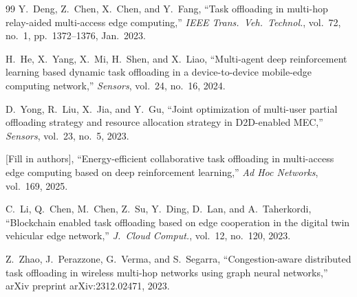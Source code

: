 \begin{thebibliography}{99}
Y.~Deng, Z.~Chen, X.~Chen, and Y.~Fang,
``Task offloading in multi-hop relay-aided multi-access edge computing,''
\textit{IEEE Trans.\ Veh.\ Technol.}, vol.~72, no.~1, pp.~1372--1376, Jan.\ 2023.

H.~He, X.~Yang, X.~Mi, H.~Shen, and X.~Liao,
``Multi-agent deep reinforcement learning based dynamic task offloading in a
device-to-device mobile-edge computing network,''
\textit{Sensors}, vol.~24, no.~16, 2024.

D.~Yong, R.~Liu, X.~Jia, and Y.~Gu,
``Joint optimization of multi-user partial offloading strategy and resource
allocation strategy in D2D-enabled MEC,''
\textit{Sensors}, vol.~23, no.~5, 2023.

[Fill in authors],
``Energy-efficient collaborative task offloading in multi-access edge computing
based on deep reinforcement learning,''
\textit{Ad Hoc Networks}, vol.~169, 2025.

C.~Li, Q.~Chen, M.~Chen, Z.~Su, Y.~Ding, D.~Lan, and A.~Taherkordi,
``Blockchain enabled task offloading based on edge cooperation in the digital twin
vehicular edge network,''
\textit{J.\ Cloud Comput.}, vol.~12, no.~120, 2023.

Z.~Zhao, J.~Perazzone, G.~Verma, and S.~Segarra,
``Congestion-aware distributed task offloading in wireless multi-hop networks
using graph neural networks,''
arXiv preprint arXiv:2312.02471, 2023.

\end{thebibliography}
